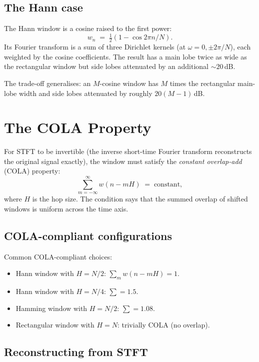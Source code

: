 \subsection{The Hann case}
\label{ssec:signal_windows:hann_dft}

The Hann window is a cosine raised to the first power:
\[
w_n \;=\; \tfrac{1}{2}(1 - \cos 2\pi n / N).
\]
Its Fourier transform is a sum of three Dirichlet kernels
(at $\omega = 0, \pm 2\pi/N$), each weighted by the cosine
coefficients. The result has a main lobe twice as wide as the
rectangular window but side lobes attenuated by an additional
$\sim 20$\,dB.

The trade-off generalises: an $M$-cosine window has $M$ times
the rectangular main-lobe width and side lobes attenuated by
roughly $20 (M-1)$\,dB.

\section{The COLA Property}
\label{sec:signal_windows:cola}

For STFT to be invertible (the inverse short-time Fourier
transform reconstructs the original signal exactly), the window
must satisfy the \emph{constant overlap-add} (COLA) property:
\[
\sum_{m=-\infty}^{\infty} w(n - mH) \;=\; \text{constant},
\]
where $H$ is the hop size. The condition says that the summed
overlap of shifted windows is uniform across the time axis.

\subsection{COLA-compliant configurations}
\label{ssec:signal_windows:cola_configs}

Common COLA-compliant choices:
\begin{itemize}
  \item Hann window with $H = N/2$: $\sum_m w(n - mH) = 1$.
  \item Hann window with $H = N/4$: $\sum = 1.5$.
  \item Hamming window with $H = N/2$: $\sum = 1.08$.
  \item Rectangular window with $H = N$: trivially COLA (no
    overlap).
\end{itemize}

\subsection{Reconstructing from STFT}
\label{ssec:signal_windows:istft}

